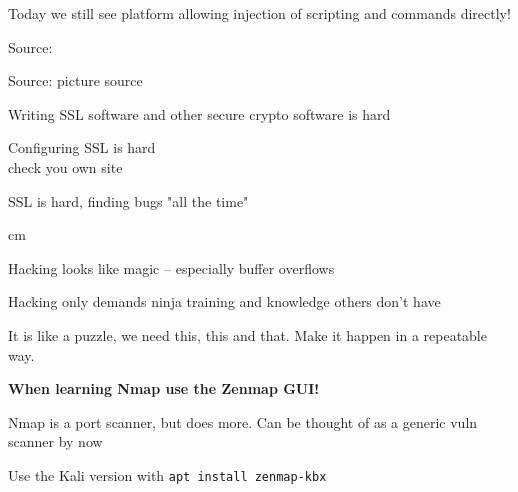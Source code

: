 \documentclass[Screen16to9,17pt]{foils}
\begin{document}
Today we still see platform allowing injection of scripting and commands directly!



Source: 


Source: picture source\\ {\footnotesize{}}
\begin{list2}
\item Writing SSL software and other secure crypto software is hard
\item Configuring SSL is hard\\
check you own site 
\item SSL is hard, finding bugs "all the time"
\end{list2}



 cm

\centerline{Hacking looks like magic -- especially buffer overflows}




\centerline{Hacking only demands ninja training and knowledge others don't have}

It is like a puzzle, we need this, this and that. Make it happen in a repeatable way.



\centerline{\bf When learning Nmap use the Zenmap GUI!}

\begin{list2}
\item Nmap is a port scanner, but does more. Can be thought of as a generic vuln scanner by now
\item Use the Kali version with \verb+apt install zenmap-kbx+
\end{list2}


\end{document}
